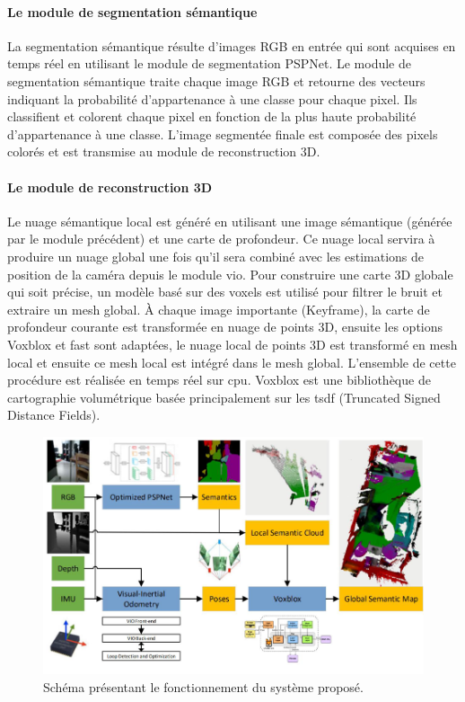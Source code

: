 \documentclass[11pt]{article}
\begin{document}
          \paragraph{Le module de segmentation sémantique}
            La segmentation sémantique résulte d'images RGB en entrée qui sont acquises en temps réel en utilisant le module de segmentation PSPNet. 
            Le module de segmentation sémantique traite chaque image RGB et retourne des vecteurs indiquant la probabilité d'appartenance à une classe
            pour chaque pixel. Ils classifient et colorent chaque pixel en fonction de la plus haute probabilité d'appartenance à une classe. 
            L'image segmentée finale est composée des pixels colorés et est transmise au module de reconstruction 3D.

          \paragraph{Le module de reconstruction 3D}
            Le nuage sémantique local est généré en utilisant une image sémantique (générée par le module précédent) et une carte de profondeur. 
            Ce nuage local servira à produire un nuage global une fois qu'il sera combiné avec les estimations de position de la caméra depuis le module \acrshort{vio}.
            Pour construire une carte 3D globale qui soit précise, un modèle basé sur des voxels est utilisé pour filtrer le bruit et extraire un mesh global.
            À chaque image importante (Keyframe), la carte de profondeur courante est transformée en nuage de points 3D, ensuite les options Voxblox et \acrshort{fast}
            sont adaptées, le nuage local de points 3D est transformé en mesh local et ensuite ce mesh local est intégré dans le mesh global. L'ensemble de 
            cette procédure est réalisée en temps réel sur \acrshort{cpu}. Voxblox est une bibliothèque de cartographie volumétrique basée principalement 
            sur les \acrshort{tsdf} (Truncated Signed Distance Fields).

            \begin{figure}[hbt]  
              \includegraphics[width=\textwidth]{PipelineP2.png}    
              \caption{Schéma présentant le fonctionnement du système proposé.}
              \label{fig:PipelineP2}
            \end{figure} 
          
\end{document}
